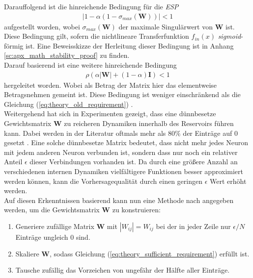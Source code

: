 Darauffolgend ist die hinreichende Bedingung für die \textit{ESP}
\begin{align}
\label{eq:theory_old_requirement}
|1-\alpha(1-\sigma_{max}(\mathbf{W}))| < 1
\end{align}
aufgestellt worden, wobei $\sigma_{max}(\mathbf{W})$ der maximale Singulärwert von $\mathbf{W}$ ist. Diese Bedingung gilt, sofern die nichtlineare Transferfunktion $f_{in}(x)$ \textit{sigmoid}-förmig ist. Eine Beweisskizze der Herleitung dieser Bedingung ist in Anhang \ref{sc:apx_math_stability_proof} zu finden.\\

Darauf basierend ist eine weitere hinreichende Bedingung
\begin{align}
\label{eq:theory_sufficient_requirement}
\rho(\alpha |\mathbf{W}|+(1-\alpha) \mathbf{I}) < 1
\end{align}
hergeleitet worden. Wobei als Betrag der Matrix hier das elementweise Betragsnehmen gemeint ist. Diese Bedingung ist weniger einschränkend als die Gleichung (\ref{eq:theory_old_requirement}) \cite{yildiz}.\\


Weitergehend hat sich in Experimenten gezeigt, dass eine dünnbesetze Gewichtsmatrix $\mathbf{W}$ zu reicheren Dynamiken innerhalb des Reservoirs führen kann. Dabei werden in der Literatur oftmals mehr als $80\%$ der Einträge auf $0$ gesetzt \citep{jaeger2010}. Eine solche dünnbesetze Matrix bedeutet, dass nicht mehr jedes Neuron mit jedem anderen Neuron verbunden ist, sondern dass nur noch ein relativer Anteil $\epsilon$ dieser Verbindungen vorhanden ist. Da durch eine größere Anzahl an verschiedenen internen Dynamiken vielfältigere Funktionen besser approximiert werden können, kann die Vorhersagequalität durch einen geringen $\epsilon$ Wert erhöht werden.\\

Auf diesen Erkenntnissen basierend kann nun eine Methode nach \cite{yildiz} angegeben werden, um die Gewichtsmatrix $\mathbf{W}$ zu konstruieren:

\singlespacing
\begin{enumerate}
	\item Generiere zufällige Matrix $\mathbf{W}$ mit ${|W_{ij}|} = {W_{ij}}$ bei der in jeder Zeile nur $\epsilon/N$ Einträge ungleich $0$ sind.
	\item Skaliere $\mathbf{W}$, sodass Gleichung (\ref{eq:theory_sufficient_requirement}) erfüllt ist.
	\item Tausche zufällig das Vorzeichen von ungefähr der Hälfte aller Einträge.
\end{enumerate}
\onehalfspacing

